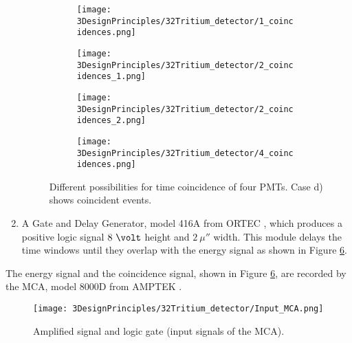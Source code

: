 \begin{enumerate}
\begin{figure}
\centering
    \begin{subfigure}[b]{0.45\textwidth}
    \centering
    \texttt{[image: 3DesignPrinciples/32Tritium\_detector/1\_coincidences.png]}  
    \caption{\label{subfig:signalInOnePMT}}
    \end{subfigure}
    \hfill
    \begin{subfigure}[b]{0.45\textwidth}
    \centering
    \texttt{[image: 3DesignPrinciples/32Tritium\_detector/2\_coincidences\_1.png]}  
    \caption{\label{subfig:signalInTwoPMTOneDetector}}
    \end{subfigure}
    \hfill
    \begin{subfigure}[b]{0.45\textwidth}
    \centering
    \texttt{[image: 3DesignPrinciples/32Tritium\_detector/2\_coincidences\_2.png]}  
    \caption{\label{subfig:signalInTwoPMTOtherDetector}}
    \end{subfigure}
    \hfill
    \begin{subfigure}[b]{0.45\textwidth}
    \centering
    \texttt{[image: 3DesignPrinciples/32Tritium\_detector/4\_coincidences.png]}  
    \caption{\label{subfig:signalInAllPMTsBothDetector}}
    \end{subfigure}
 \caption{Different possibilities for time coincidence of four PMTs. Case d) shows coincident events.}
 \label{fig:DifferentCoincidences}
\end{figure}

\item{} A Gate and Delay Generator, model 416A from ORTEC \cite{DataSheetGateAndDelay}, which produces a positive logic signal $8~\volt$ height and $2~\mu\second$ width. This module delays the time windows until they overlap with the energy signal as shown in Figure \ref{fig:InputSignalsMCA}.

\end{enumerate}

The energy signal and the coincidence signal, shown in Figure \ref{fig:InputSignalsMCA}, are recorded by the MCA, model 8000D from AMPTEK \cite{DataSheetMCA}.

\begin{figure}[htbp]
\centering
\texttt{[image: 3DesignPrinciples/32Tritium\_detector/Input\_MCA.png]}
\caption{Amplified signal and logic gate (input signals of the MCA).\label{fig:InputSignalsMCA}}
\end{figure}